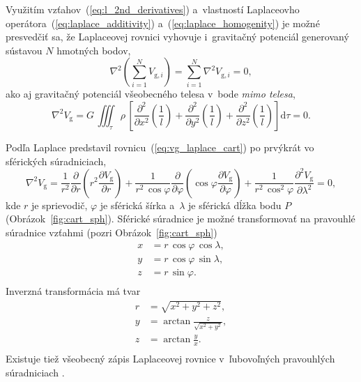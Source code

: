 \documentclass[a4paper, 12pt]{book}
\newcommand{\diff}{\mathrm d}
\newcommand{\gidx}{\mathrm g}
\begin{document}
Využitím vzťahov~(\ref{eq:l_2nd_derivatives}) a~vlastností Laplaceovho 
operátora~(\ref{eq:laplace_additivity}) a~(\ref{eq:laplace_homogenity}) je 
možné presvedčiť sa, že Laplaceovej rovnici vyhovuje i~gravitačný potenciál 
generovaný sústavou $N$ hmotných bodov,
%
\begin{equation}
\nabla^2 \left( \sum_{i = 1}^N V_{\gidx,i} \right) = \sum_{i = 1}^N \nabla^2 
V_{\gidx,i} = 0{,}
\end{equation}
%
ako aj gravitačný potenciál všeobecného telesa v~bode \emph{mimo telesa},
%
\begin{equation}
\nabla^2 V_\gidx = G\, \iiint_\tau \rho \, \left[ \frac{\partial^2}{\partial 
x^2}\left(\frac{1}{l}\right) + \frac{\partial^2}{\partial 
y^2}\left(\frac{1}{l}\right) + \frac{\partial^2}{\partial 
z^2}\left(\frac{1}{l}\right) \right] \diff\tau = 0{.}
\end{equation}

Podľa \cite{MacMillan1930} Laplace predstavil 
rovnicu~(\ref{eq:vg_laplace_cart}) po prvýkrát vo sférických súradniciach,
%
\begin{equation}
\label{eq:vg_laplace_sph}
\nabla^2 V_\gidx = \frac{1}{r^2} \frac{\partial}{\partial r} \left( r^2 
\frac{\partial V_\gidx}{\partial r} \right) + \frac{1}{r^2 \, \cos\varphi} 
\frac{\partial}{\partial \varphi} \left( \cos\varphi \frac{\partial 
V_\gidx}{\partial \varphi} \right) + \frac{1}{r^2 \, 
\cos^2\varphi}\frac{\partial^2 V_\gidx}{\partial \lambda^2} = 0{,}
\end{equation}
%
kde $r$ je sprievodič, $\varphi$ je sférická šírka a~$\lambda$ je sférická 
dĺžka bodu $P$ (Obrázok~\ref{fig:cart_sph}).  Sférické súradnice je možné 
transformovať na pravouhlé súradnice vzťahmi (pozri Obrázok~\ref{fig:cart_sph})
%
\begin{equation}
\label{eq:sph2cart}
\begin{split}
x &= r \, \cos\varphi \, \cos\lambda{,}\\
y &= r \, \cos\varphi \, \sin\lambda{,}\\
z &= r \, \sin\varphi{.}\\
\end{split}
\end{equation}
%
Inverzná transformácia má tvar
%
\begin{equation}
\label{eq:cart2sph}
\begin{split}
r &= \sqrt{x^2 + y^2 + z^2}{,}\\
y &= \arctan \frac{z}{\sqrt{x^2 + y^2}}{,}\\
z &= \arctan \frac{y}{x}{.}\\
\end{split}
\end{equation}
%
Existuje tiež všeobecný zápis Laplaceovej rovnice v~ľubovoľných pravouhlých 
súradniciach \citep[pozri napríklad][]{MoritzPhysicalGeodesy}.
\end{document}
